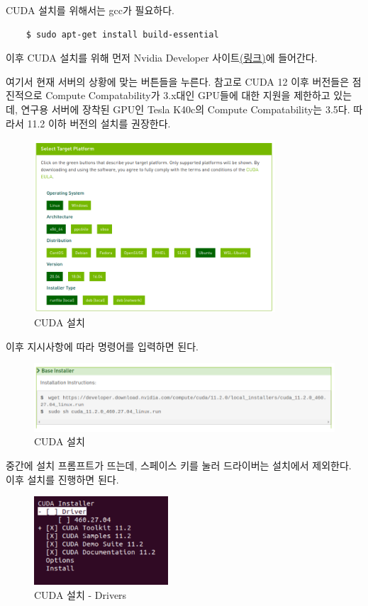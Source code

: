 CUDA 설치를 위해서는 gcc가 필요하다.
\begin{lstlisting}
    $ sudo apt-get install build-essential
\end{lstlisting}
이후 CUDA 설치를 위해 먼저 Nvidia Developer 사이트\href{https://developer.nvidia.com/cuda-toolkit-archive}{(링크)}에 들어간다.

여기서 현재 서버의 상황에 맞는 버튼들을 누른다. 참고로 CUDA 12 이후 버전들은 점진적으로 Compute Compatability가 3.x대인 GPU들에 대한 지원을 제한하고 있는데, 연구용 서버에 장착된 GPU인 Tesla K40c의 Compute Compatability는 3.5다. 따라서 11.2 이하 버전의 설치를 권장한다.
\begin{figure}[H]
	\begin{center}
        \includegraphics[width=9cm]{cuda1}
        \caption{CUDA 설치}
    \end{center}
\end{figure}
이후 지시사항에 따라 명령어를 입력하면 된다.
\begin{figure}[H]
	\begin{center}
        \includegraphics[width=12cm]{cuda2}
        \caption{CUDA 설치}
    \end{center}
\end{figure}


중간에 설치 프롬프트가 뜨는데, 스페이스 키를 눌러 드라이버는 설치에서 제외한다. 이후 설치를 진행하면 된다.
\begin{figure}[H]
	\begin{center}
        \includegraphics[width=5cm]{cuda3}
        \caption{CUDA 설치 - Drivers}
    \end{center}
\end{figure}

